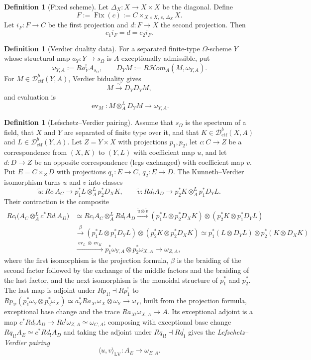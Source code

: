 \documentclass[10pt]{article}
\theoremstyle{definition}
\newtheorem{definition}[theorem]{Definition}
\newcommand{\Dctf}{\mathcal D^b_{\mathrm{ctf}}}
\newcommand{\Fix}{\operatorname{Fix}}
\begin{document}
\begin{definition}[Fixed scheme]
Let \(\Delta_X:X\to X\times X\) be the diagonal.  Define
\[
 F:=\Fix(c):=
 C\times_{X\times X,\,c,\,\Delta_X}X.
\]
Let \(i_F:F\to C\) be the first projection and
\(d:F\to X\) the second projection.  Then
\[
 c_1i_F=d=c_2i_F.
\]
\end{definition}

\begin{definition}[Verdier duality data]
For a separated finite-type \(\Omega\)-scheme \(Y\) whose structural map
\(a_Y:Y\to s_\Omega\) is \(A\)-exceptionally admissible, put
\[
 \omega_{Y,A}:=Ra_Y^!A_{s_\Omega},\qquad
 D_YM:=R\mathcal Hom_A(M,\omega_{Y,A}).
\]
For \(M\in\Dctf(Y,A)\), Verdier biduality gives
\[
 M\xrightarrow{\sim}D_YD_YM,
\]
and evaluation is
\[
 \operatorname{ev}_M:M\otimes_A^LD_YM\to\omega_{Y,A}.
\]
\end{definition}

\begin{definition}[Lefschetz--Verdier pairing]
Assume that \(s_\Omega\) is the spectrum of a field, that \(X\) and \(Y\) are
separated of finite type over it, and that \(K\in\Dctf(X,A)\) and
\(L\in\Dctf(Y,A)\).  Let \(Z=Y\times X\) with projections \(p_1,p_2\), let
\(c:C\to Z\) be a correspondence from \((X,K)\) to \((Y,L)\) with coefficient
map \(u\), and let \(d:D\to Z\) be an opposite correspondence (legs exchanged)
with coefficient map \(v\).  Put \(E=C\times_ZD\) with projections
\(q_1:E\to C\), \(q_2:E\to D\).  The Kunneth--Verdier isomorphism turns \(u\)
and \(v\) into classes
\[
 \widetilde u:Rc_!A_C\to p_1^*L\otimes_A^Lp_2^*D_XK,\qquad
 \widetilde v:Rd_!A_D\to p_2^*K\otimes_A^Lp_1^*D_YL.
\]
Their contraction is the composite
\[
\begin{aligned}
 Rc_!\bigl(A_C\otimes_A^Lc^*Rd_!A_D\bigr)
 &\simeq Rc_!A_C\otimes_A^LRd_!A_D
 \xrightarrow{\widetilde u\otimes\widetilde v}
 (p_1^*L\otimes p_2^*D_XK)\otimes(p_2^*K\otimes p_1^*D_YL)\\
 &\xrightarrow{\ \beta\ }
 (p_1^*L\otimes p_1^*D_YL)\otimes(p_2^*K\otimes p_2^*D_XK)
 \simeq p_1^*(L\otimes D_YL)\otimes p_2^*(K\otimes D_XK)\\
 &\xrightarrow{\operatorname{ev}_L\otimes\operatorname{ev}_K}
 p_1^*\omega_{Y,A}\otimes p_2^*\omega_{X,A}
 \longrightarrow\omega_{Z,A},
\end{aligned}
\]
where the first isomorphism is the projection formula, \(\beta\) is the
braiding of the second factor followed by the exchange of the middle factors
and the braiding of the last factor, and the next isomorphism is the monoidal
structure of \(p_1^*\) and \(p_2^*\).  The last map is adjoint under
\(Rp_{1!}\dashv Rp_1^!\) to
\(Rp_{1!}(p_1^*\omega_Y\otimes p_2^*\omega_X)\simeq
a_Y^*Ra_{X!}\omega_X\otimes\omega_Y\to\omega_Y\), built from the
projection formula, exceptional base change and the trace
\(Ra_{X!}\omega_{X,A}\to A\).  Its exceptional adjoint is a map
\(c^*Rd_!A_D\to Rc^!\omega_{Z,A}\simeq\omega_{C,A}\); composing with
exceptional base change \(Rq_{1!}A_E\simeq c^*Rd_!A_D\) and taking the
adjoint under \(Rq_{1!}\dashv Rq_1^!\) gives the
\emph{Lefschetz--Verdier pairing}
\[
 \langle u,v\rangle_{\mathrm{LV}}:A_E\longrightarrow\omega_{E,A}.
\]
\end{definition}
\end{document}
